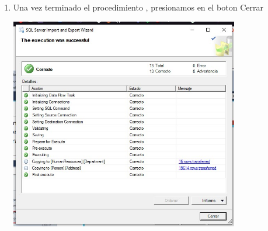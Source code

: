 \begin{enumerate}
     \item Una vez terminado el procedimiento , presionamos en el boton Cerrar
        \begin{center}
             \includegraphics[width=10cm]{imagenes/importa_data_9.jpg}
        \end{center}

\end{enumerate}